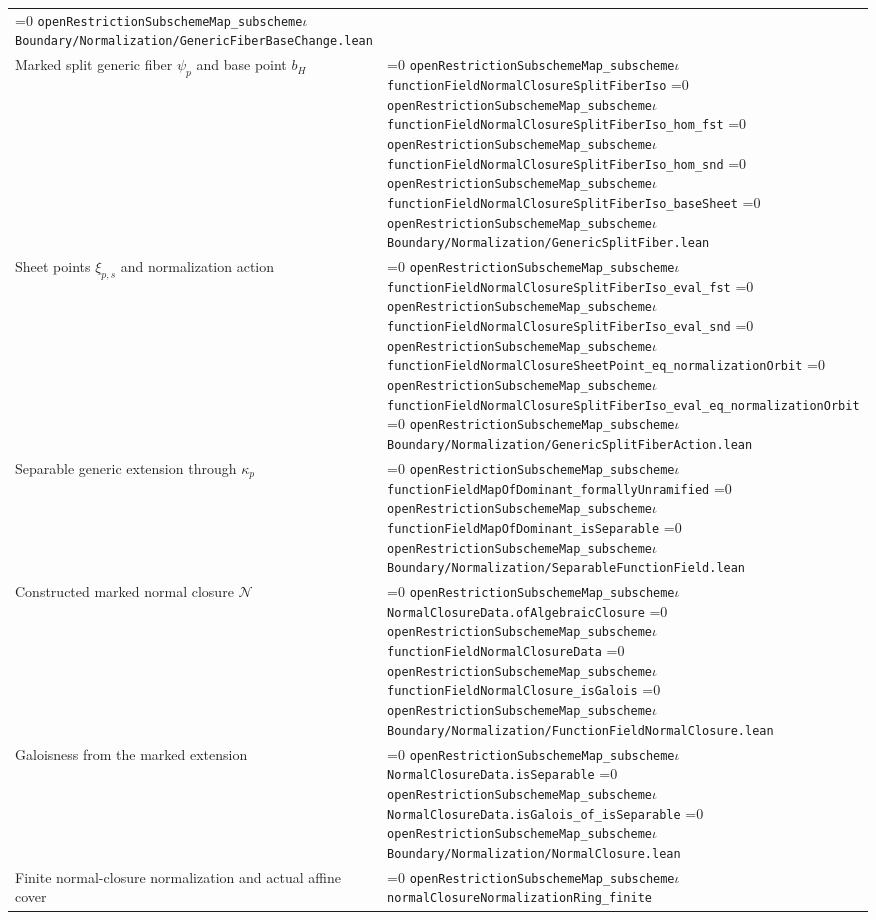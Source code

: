 \documentclass[11pt]{article}
\theoremstyle{definition}
\theoremstyle{remark}
\newcommand{\leanpath}[1]{%
  \ifnum\pdfstrcmp{\detokenize{#1}}%
      {\detokenize{openRestrictionSubschemeMap_subschemeι}}=0
    \texttt{\nolinkurl{openRestrictionSubschemeMap_subscheme}}\ensuremath{\iota}%
  \else
    \texttt{\nolinkurl{#1}}%
  \fi}
\begin{document}
\begin{longtable}{@{}>{\raggedright\arraybackslash}p{}
                >{\raggedright\arraybackslash}p{}@{}}
\leanpath{Boundary/Normalization/GenericFiberBaseChange.lean}\\
Marked split generic fiber \(\psi_p\) and base point \(b_H\) &
\leanpath{functionFieldNormalClosureSplitFiberIso}\newline
\leanpath{functionFieldNormalClosureSplitFiberIso_hom_fst}\newline
\leanpath{functionFieldNormalClosureSplitFiberIso_hom_snd}\newline
\leanpath{functionFieldNormalClosureSplitFiberIso_baseSheet}\newline
\leanpath{Boundary/Normalization/GenericSplitFiber.lean}\\
Sheet points \(\xi_{p,s}\) and normalization action &
\leanpath{functionFieldNormalClosureSplitFiberIso_eval_fst}\newline
\leanpath{functionFieldNormalClosureSplitFiberIso_eval_snd}\newline
\leanpath{functionFieldNormalClosureSheetPoint_eq_normalizationOrbit}\newline
{\footnotesize\leanpath{functionFieldNormalClosureSplitFiberIso_eval_eq_normalizationOrbit}}\newline
\leanpath{Boundary/Normalization/GenericSplitFiberAction.lean}\\
Separable generic extension through \(\kappa_p\) &
\leanpath{functionFieldMapOfDominant_formallyUnramified}\newline
\leanpath{functionFieldMapOfDominant_isSeparable}\newline
\leanpath{Boundary/Normalization/SeparableFunctionField.lean}\\
Constructed marked normal closure \(\mathcal N\) &
\leanpath{NormalClosureData.ofAlgebraicClosure}\newline
\leanpath{functionFieldNormalClosureData}\newline
\leanpath{functionFieldNormalClosure_isGalois}\newline
\leanpath{Boundary/Normalization/FunctionFieldNormalClosure.lean}\\
Galoisness from the marked extension &
\leanpath{NormalClosureData.isSeparable}\newline
\leanpath{NormalClosureData.isGalois_of_isSeparable}\newline
\leanpath{Boundary/Normalization/NormalClosure.lean}\\
Finite normal-closure normalization and actual affine cover &
\leanpath{normalClosureNormalizationRing_finite}\newline

\end{longtable}
\end{document}
